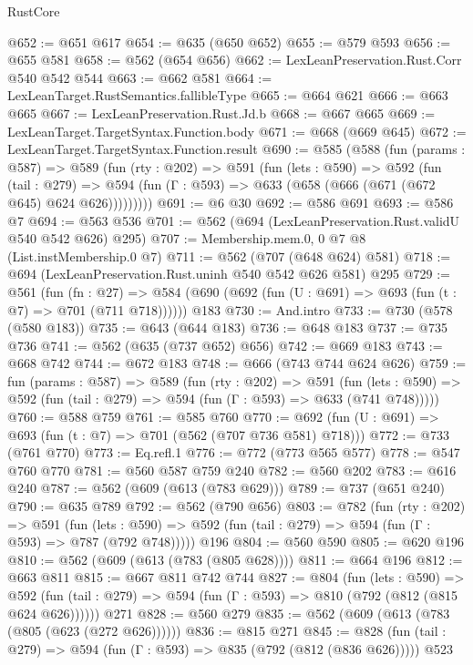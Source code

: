 \begin{lexlean}{RustCore}
\begin{coremodule}
@652 := @651 @617
@654 := @635 (@650 @652)
@655 := @579 @593
@656 := @655 @581
@658 := @562 (@654 @656)
@662 := LexLeanPreservation.Rust.Corr @540 @542 @544
@663 := @662 @581
@664 := LexLeanTarget.RustSemantics.fallibleType
@665 := @664 @621
@666 := @663 @665
@667 := LexLeanPreservation.Rust.Jd.b
@668 := @667 @665
@669 := LexLeanTarget.TargetSyntax.Function.body
@671 := @668 (@669 @645)
@672 := LexLeanTarget.TargetSyntax.Function.result
@690 := @585
    (@588
      (fun (params : @587) =>
      @589
        (fun (rty : @202) =>
        @591
          (fun (lets : @590) =>
          @592
            (fun (tail : @279) =>
            @594 (fun (Γ : @593) => @633 (@658 (@666 (@671 (@672 @645) @624 @626)))))))))
@691 := @6 @30
@692 := @586 @691
@693 := @586 @7
@694 := @563 @536
@701 := @562 (@694 (LexLeanPreservation.Rust.validU @540 @542 @626) @295)
@707 := Membership.mem.{0, 0} @7 @8 (List.instMembership.{0} @7)
@711 := @562 (@707 (@648 @624) @581)
@718 := @694 (LexLeanPreservation.Rust.uninh @540 @542 @626 @581) @295
@729 := @561
    (fun (fn : @27) =>
    @584 (@690 (@692 (fun (U : @691) => @693 (fun (t : @7) => @701 (@711 @718))))))
    @183
@730 := And.intro
@733 := @730 (@578 (@580 @183))
@735 := @643 (@644 @183)
@736 := @648 @183
@737 := @735 @736
@741 := @562 (@635 (@737 @652) @656)
@742 := @669 @183
@743 := @668 @742
@744 := @672 @183
@748 := @666 (@743 @744 @624 @626)
@759 := fun (params : @587) =>
  @589
    (fun (rty : @202) =>
    @591
      (fun (lets : @590) => @592 (fun (tail : @279) => @594 (fun (Γ : @593) => @633 (@741 @748)))))
@760 := @588 @759
@761 := @585 @760
@770 := @692 (fun (U : @691) => @693 (fun (t : @7) => @701 (@562 (@707 @736 @581) @718)))
@772 := @733 (@761 @770)
@773 := Eq.refl.{1}
@776 := @772 (@773 @565 @577)
@778 := @547 @760 @770
@781 := @560 @587 @759 @240
@782 := @560 @202
@783 := @616 @240
@787 := @562 (@609 (@613 (@783 @629)))
@789 := @737 (@651 @240)
@790 := @635 @789
@792 := @562 (@790 @656)
@803 := @782
    (fun (rty : @202) =>
    @591
      (fun (lets : @590) => @592 (fun (tail : @279) => @594 (fun (Γ : @593) => @787 (@792 @748)))))
    @196
@804 := @560 @590
@805 := @620 @196
@810 := @562 (@609 (@613 (@783 (@805 @628))))
@811 := @664 @196
@812 := @663 @811
@815 := @667 @811 @742 @744
@827 := @804
    (fun (lets : @590) =>
    @592 (fun (tail : @279) => @594 (fun (Γ : @593) => @810 (@792 (@812 (@815 @624 @626))))))
    @271
@828 := @560 @279
@835 := @562 (@609 (@613 (@783 (@805 (@623 (@272 @626))))))
@836 := @815 @271
@845 := @828 (fun (tail : @279) => @594 (fun (Γ : @593) => @835 (@792 (@812 (@836 @626))))) @523

\end{coremodule}
\end{lexlean}
